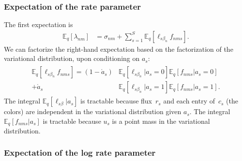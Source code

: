 \subsubsection{Expectation of the rate parameter}
The first expectation is
\begin{align}
\mathbb{E}_{q}\left[\lambda_{nm}\right]
&= \sigma_{nm} + \sum_{s=1}^S
     \mathbb E_q \left[ \ell_{s\beta_n} f_{nms} \right].
\end{align}
We can factorize the right-hand expectation based on the factorization of the variational distribution, upon conditioning on $a_s$:
\begin{align}
\begin{split}
\mathbb E_q \left[ \ell_{s\beta_n} f_{nms} \right]
= (1 - \acute a_s) &\mathbb E_q \left[ \ell_{s\beta_n} | a_s = 0 \right]\mathbb E_q \left[ f_{nms} | a_s = 0 \right]\\
+ \acute a_s &\mathbb E_q \left[ \ell_{s\beta_n} | a_s = 1 \right]\mathbb E_q \left[ f_{nms} | a_s = 1 \right].
\end{split}
\label{conditional}
\end{align}
The integral $\mathbb E_q \left[ \ell_{s\beta} | a_s \right]$ is tractable because flux~$r_s$
and each entry of~$c_s$ (the colors) are independent in the variational distribution given $a_s$.
The integral~$\mathbb E_q \left[ f_{nms} | a_s \right]$ is tractable because $u_s$ is a point mass in the variational distribution.


\subsubsection{Expectation of the log rate parameter}

